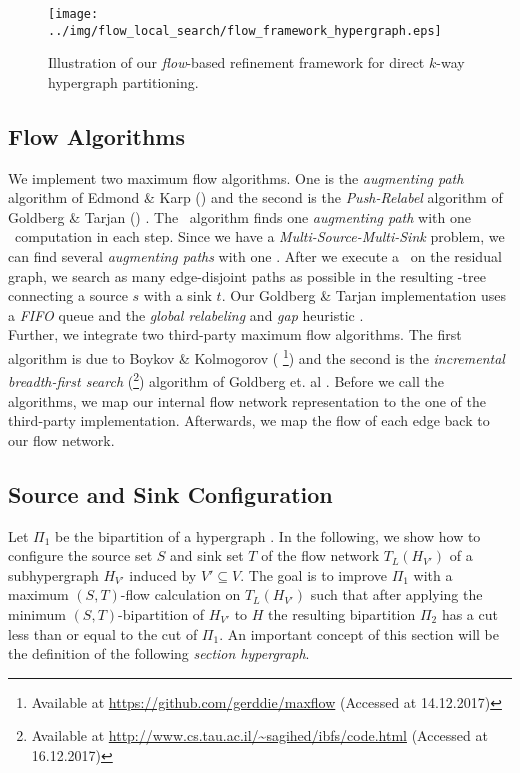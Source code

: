 \begin{figure}
\centering 
\texttt{[image: ../img/flow\_local\_search/flow\_framework\_hypergraph.eps]}
\caption{Illustration of our \emph{flow}-based refinement framework for direct $k$-way hypergraph
         partitioning.}
\label{img:flow_framework}
\end{figure} 

\subsection{Flow Algorithms}
\label{sec:flow_algo_implementation}

We implement two maximum flow algorithms.
One is the \emph{augmenting path} algorithm of Edmond \& Karp (\EdmondKarp)
\cite{edmonds1972theoretical} 
and the second is the \emph{Push-Relabel} algorithm of
Goldberg \& Tarjan (\GoldbergTarjan) \cite{cherkassky1997implementing,goldberg1988new}. 
The \EdmondKarp~algorithm finds one \emph{augmenting path} with one \BFS~computation in each step.
Since we have a \emph{Multi-Source-Multi-Sink} problem, we can find several \emph{augmenting paths}
with one \BFS. After we execute a \BFS~on the residual graph, we search 
as many edge-disjoint paths as possible in the resulting \BFS-tree connecting a source $s$
with a sink $t$. Our Goldberg \& Tarjan implementation uses a \emph{FIFO} queue and
the \emph{global relabeling} and \emph{gap} heuristic \cite{cherkassky1997implementing}. \\
Further, we integrate two third-party maximum flow algorithms. The first algorithm is due to 
Boykov \& Kolmogorov \cite{boykov2004experimental} (\BoykovKolmogorov
\footnote{Available at \url{https://github.com/gerddie/maxflow} (Accessed at 14.12.2017)})
and the second is the \emph{incremental breadth-first search} 
(\IBFS \footnote{Available at \url{http://www.cs.tau.ac.il/~sagihed/ibfs/code.html} (Accessed at 16.12.2017)})
algorithm of Goldberg et. al \cite{goldberg2015faster}.
Before we call the algorithms, we map our internal flow network representation to
the one of the third-party implementation. Afterwards, we map the flow of each edge back
to our flow network.


\subsection{Source and Sink Configuration}
\label{sec:source_and_sink}

Let $\Pi_1$ be the bipartition of a hypergraph \HypergraphDef.
In the following, we show how to configure the source set $S$ and sink set $T$ of the flow
network $T_L(H_{V'})$ of a subhypergraph $H_{V'}$ induced by $V' \subseteq V$. The goal is 
to improve $\Pi_1$ with a maximum $(S,T)$-flow calculation 
on $T_L(H_{V'})$ such that after applying the minimum 
$(S,T)$-bipartition of $H_{V'}$ to $H$ the resulting bipartition $\Pi_2$ has a 
cut less than or equal to the cut of $\Pi_1$. An important concept of this section will
be the definition of the following \emph{section hypergraph}. 

